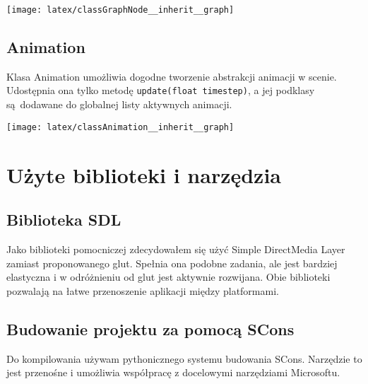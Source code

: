 \documentclass[12pt,a4paper]{article}
\begin{document}
\begin{center}
\texttt{[image: latex/classGraphNode\_\_inherit\_\_graph]}
\end{center}

\subsection{Animation}
Klasa Animation umożliwia dogodne tworzenie abstrakcji animacji w scenie.
Udostępnia ona tylko metodę \texttt{update(float~timestep)}, a jej podklasy
są~dodawane do globalnej listy aktywnych animacji.

\begin{center}
\texttt{[image: latex/classAnimation\_\_inherit\_\_graph]}
\end{center}

\section{Użyte biblioteki i narzędzia}
\label{sec:narz}
\subsection{Biblioteka SDL}
Jako biblioteki pomocniczej zdecydowałem się użyć Simple DirectMedia Layer
zamiast proponowanego glut.  Spełnia ona podobne zadania, ale jest bardziej
elastyczna i w odróżnieniu od glut jest aktywnie rozwijana.  Obie biblioteki
pozwalają na łatwe przenoszenie aplikacji między platformami.

\subsection{Budowanie projektu za pomocą SCons}
Do kompilowania używam pythonicznego systemu budowania SCons.  Narzędzie to jest
przenośne i umożliwia współpracę z docelowymi narzędziami Microsoftu.
\end{document}
